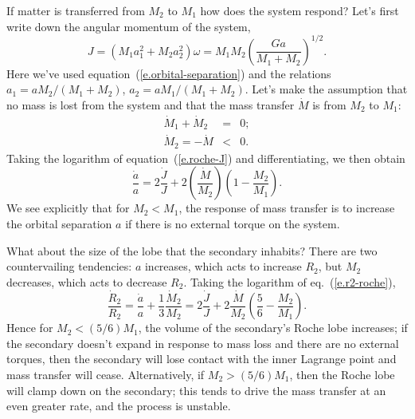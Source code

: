 If matter is transferred from $M_{2}$ to $M_{1}$ how does the system respond?  Let's first write down the angular momentum of the system,
\begin{equation}\label{e.roche-J}
J = (M_{1}a_{1}^{2} + M_{2}a_{2}^{2}) \omega = M_{1}M_{2}\left(\frac{Ga}{M_{1}+M_{2}}\right)^{1/2}.
\end{equation}
Here we've used equation~(\ref{e.orbital-separation}) and the relations $a_{1} = aM_{2}/(M_{1}+M_{2})$, $a_{2} = aM_{1}/(M_{1}+M_{2})$.  Let's make the assumption that no mass is lost from the system and that the mass transfer $\dot{M}$ is from $M_{2}$ to $M_{1}$:
\begin{eqnarray*}
\dot{M}_{1} + \dot{M}_{2} &=& 0;\\
\dot{M}_{2} = -\dot{M} &<& 0.
\end{eqnarray*}
Taking the logarithm of equation~(\ref{e.roche-J}) and differentiating, we then obtain
\begin{equation}\label{e.roche-adot}
\frac{\dot{a}}{a} = 2\frac{\dot{J}}{J}  + 2 \left(\frac{\dot{M}}{M_{2}}\right) \left(1-\frac{M_{2}}{M_{1}}\right).
\end{equation}
We see explicitly that for $M_{2}< M_{1}$, the response of mass transfer is to increase the orbital separation $a$ if there is no external torque on the system.

What about the size of the lobe that the secondary inhabits?  There are two countervailing tendencies: $a$ increases, which acts to increase $R_{2}$, but $M_{2}$ decreases, which acts to decrease $R_{2}$.  Taking the logarithm of eq.~(\ref{e.r2-roche}),
\begin{equation}\label{e.r2dot}
\frac{\dot{R}_{2}}{R_{2}} = \frac{\dot{a}}{a} + \frac{1}{3}\frac{\dot{M}_{2}}{M_{2}} = 2\frac{\dot{J}}{J} + 2\frac{\dot{M}}{M_{2}} \left(\frac{5}{6} - \frac{M_{2}}{M_{1}}\right).
\end{equation}
Hence for $M_{2} < (5/6) M_{1}$, the volume of the secondary's Roche lobe increases; if the secondary doesn't expand in response to mass loss and there are no external torques, then the secondary will lose contact with the inner Lagrange point and mass transfer will cease.  Alternatively, if $M_{2} > (5/6) M_{1}$, then the Roche lobe will clamp down on the secondary; this tends to drive the mass transfer at an even greater rate, and the process is unstable.

